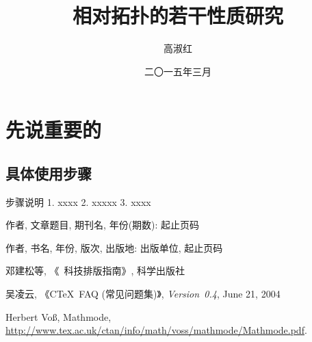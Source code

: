 \documentclass[forlib]{HNUthesis}   %
\begin{document}

\title{相对拓扑的若干性质研究}               %
\author{高淑红}                             %
\date{二〇一五年三月}                       %

\maketitle


\tableofcontents
\thispagestyle{empty}

\frontmatter  %

\mainmatter   %

\baselineskip=21pt  %
\chapter{先说重要的}

\section{具体使用步骤}

步骤说明
1. xxxx
2. xxxxx
3. xxxx


\cleardoublepage{}
{}
\begin{thebibliography}{000}

   作者, 文章题目, 期刊名, 年份(期数): 起止页码

   作者, 书名, 年份, 版次, 出版地: 出版单位, 起止页码

   邓建松等, 《\LaTeXe~科技排版指南》, 科学出版社

   吴凌云, 《CTeX~FAQ (常见问题集)》, \textit{Version~0.4}, June 21, 2004

   Herbert Vo\ss, Mathmode, \url{http://www.tex.ac.uk/ctan/info/math/voss/mathmode/Mathmode.pdf}.

\end{thebibliography}



\backmatter
\cleardoublepage
\end{document}
